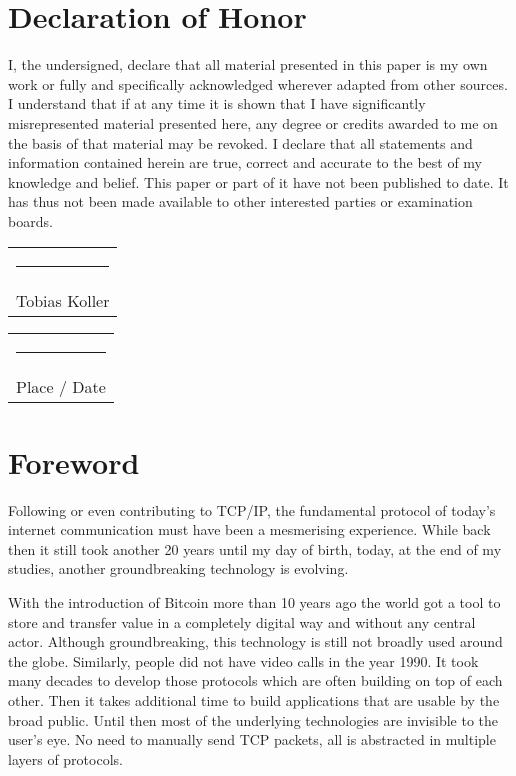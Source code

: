 \documentclass[final]{fhnwreport}       %
\begin{document}
\tableofcontents
\clearpage

\vfill\noindent
\section*{Declaration of Honor}

I, the undersigned, declare that all material presented in this paper is my own work or fully and specifically acknowledged wherever adapted from other sources. I understand that if at any time it is shown that I have significantly misrepresented material presented here, any degree or credits awarded to me on the basis of that material may be revoked. I declare that all statements and information contained herein are true, correct and accurate to the best of my knowledge and belief. This  paper or part of it have not been published to date. It has thus not been made available to other interested parties or examination boards.  

\vspace*{4em}\noindent
\hfill%
\begin{tabular}[t]{c}
  \rule{10em}{0.4pt}\\Tobias Koller 
\end{tabular}%
\hfill%
\begin{tabular}[t]{c}
  \rule{10em}{0.4pt}\\ Place / Date
\end{tabular}%
\hfill\strut
\clearpage

\section*{Foreword}

Following or even contributing to TCP/IP, the fundamental protocol of today's internet communication must have been a mesmerising experience. While back then it still took another 20 years until my day of birth, today, at the end of my studies, another groundbreaking technology is evolving. 

With the introduction of Bitcoin more than 10 years ago the world got a tool to store and transfer value in a completely digital way and without any central actor. Although groundbreaking, this technology is still not broadly used around the globe. Similarly, people did not have video calls in the year 1990. It took many decades to develop those protocols which are often building on top of each other. Then it takes additional time to build applications that are usable by the broad public.  Until then most of the underlying technologies are invisible to the user's eye. No need to manually send TCP packets, all is abstracted in multiple layers of protocols.
\end{document}
